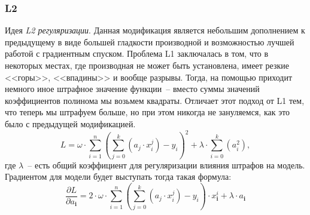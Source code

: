 \documentclass[12pt, a4paper, oneside, final]{article}
\begin{document}
	\subsubsection*{L2}
	Идея \textit{L2 регуляризации}.
	Данная модификация является небольшим дополнением к предыдущему в виде большей гладкости производной и возможностью лучшей работой с градиентным спуском.
	Проблема L1 заключалась в том, что в некоторых местах, где производная не может быть установлена, имеет резкие <<горы>>, <<впадины>> и вообще разрывы.
	Тогда, на помощью приходит немного иное штрафное значение функции~-- вместо суммы значений коэффициентов полинома мы возьмем квадраты.
	Отличает этот подход от L1 тем, что теперь мы штрафуем больше, но при этом никогда не зануляемся, как это было с предыдущей модификацией.
	\[
		L = \omega\cdot\sum\limits_{i = 1}^{n}{\left(\sum\limits_{j = 0}^{k}{\left(a_{j} \cdot x^{j}_{i}\right)} - y_{i}\right)^{2}} + \lambda \cdot \sum\limits_{i = 0}^{k}{\left(a_{i}^2\right)},
	\]
	где $\lambda$~-- есть общий коэффициент для регуляризации влияния штрафов на модель.
	Градиентом для модели будет выступать тогда такая формула:
	\[
		\dfrac{\partial{L}}{\partial{a_{\mathbf{i}}}} = 2\cdot\omega\cdot\sum\limits_{i = 1}^{n}{\left(\sum\limits_{j = 0}^{k}{\left(a_{j} \cdot x_{i}^{j}\right)} - y_{i}\right) \cdot x^{i}_{\mathbf{i}}} + \lambda \cdot a_{\mathbf{i}}
	\]
\end{document}
